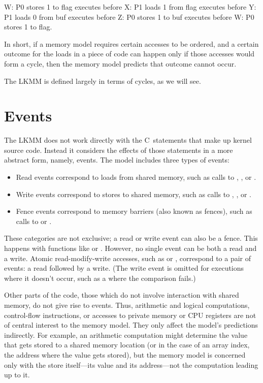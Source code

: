\begin{VerbatimU}
	W: P0 stores 1 to flag   executes before
	X: P1 loads 1 from flag  executes before
	Y: P1 loads 0 from buf   executes before
	Z: P0 stores 1 to buf    executes before
	W: P0 stores 1 to flag.
\end{VerbatimU}

In short, if a memory model requires certain accesses to be ordered,
and a certain outcome for the loads in a piece of code can happen only
if those accesses would form a cycle, then the memory model predicts
that outcome cannot occur.

The LKMM is defined largely in terms of cycles, as we will see.


\section{Events}
\label{sec:docs:explanation:Events}

The LKMM does not work directly with the C~statements that make up
kernel source code.
Instead it considers the effects of those statements in a more
abstract form, namely, events.
The model includes three types of events:

\begin{itemize}
\item	Read events correspond to loads from shared memory, such as
	calls to , , or
	.

\item	Write events correspond to stores to shared memory, such as
	calls to , , or
	.

\item	Fence events correspond to memory barriers (also known as
	fences), such as calls to  or .
\end{itemize}

These categories are not exclusive; a read or write event can also be
a fence.
This happens with functions like  or .
However, no single event can be both a read and a write.
Atomic read-modify-write accesses, such as  or ,
correspond to a pair of events: a read followed by a write.
(The write event is omitted for executions where it doesn't occur,
such as a  where the comparison fails.)

Other parts of the code, those which do not involve interaction with
shared memory, do not give rise to events.
Thus, arithmetic and logical computations, control-flow instructions,
or accesses to private memory or CPU registers are not of central
interest to the memory model.
They only affect the model's predictions indirectly.
For example, an arithmetic computation might determine the value that
gets stored to a shared memory location (or in the case of an array
index, the address where the value gets stored), but the memory model
is concerned only with the store itself---its value and its
address---not the computation leading up to it.

